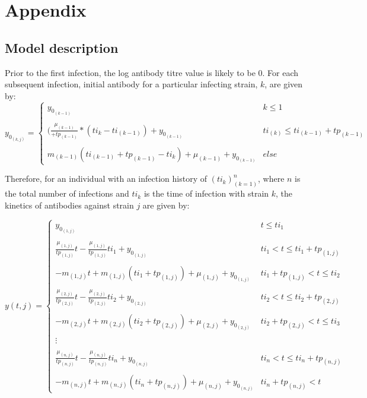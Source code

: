 \documentclass[a4paper,11pt,twoside]{article}
\begin{document}
\section{Appendix}
\subsection{Model description}
Prior to the first infection, the log antibody titre value is likely to be 0. For each subsequent infection, initial antibody for a particular infecting strain, $k$, are given by:
\begin{equation}
 y_{0_{(k,j)}}=\left\{
 \begin{array}{lr}
   y_{0_{(k-1)}} & k \leqslant 1\\\\
   (\frac{\mu_{(k-1)}}{+tp_{(k-1)}}*(ti_k-ti_{(k-1)}) + y_{0_{(k-1)}} & ti_{(k)} \leqslant ti_{(k-1)} + tp_{(k-1)}\\\\
   m_{(k-1)}(ti_{(k-1)}+tp_{(k-1)}-ti_k)+\mu_{(k-1)} + y_{0_{(k-1)}}& else
 \end{array}
\right.
\end{equation}

Therefore, for an individual with an infection history of $(ti_k)_{(k=1)}^n$, where $n$ is the total number of infections and $ti_k$ is the time of infection with strain $k$, the kinetics of antibodies against strain $j$ are given by:

\begin{equation}
y(t, j) = \left\{
\begin{array}{lr}
y_{0_{(1,j)}} & t \leqslant ti_1\\\\
\frac{\mu_{(1,j)}}{tp_{(1,j)}}t-\frac{\mu_{(1,j)}}{tp_{(1,j)}}ti_1 + y_{0_{(1,j)}} & ti_1 < t \leqslant ti_1 + tp_{(1,j)}\\\\
-m_{(1,j)}t + m_{(1,j)}(ti_1+tp_{(1,j)})+\mu_{(1,j)}+y_{0_{(1,j)}} & ti_1+tp_{(1,j)} < t \leqslant ti_2\\\\
\frac{\mu_{(2,j)}}{tp_{(2,j)}}t-\frac{\mu_{(2,j)}}{tp_{(2,j)}}ti_2 + y_{0_{(2,j)}} & ti_2 < t \leqslant ti_2 + tp_{(2,j)}\\\\
-m_{(2,j)}t + m_{(2,j)}(ti_2+tp_{(2,j)})+\mu_{(2,j)}+y_{0_{(2,j)}} & ti_2+tp_{(2,j)} < t \leqslant ti_3\\\\
\vdots\\\\
\frac{\mu_{(n,j)}}{tp_{(n,j)}}t-\frac{\mu_{(n,j)}}{tp_{(n,j)}}ti_n + y_{0_{(n,j)}} & ti_n < t \leqslant ti_n + tp_{(n,j)}\\\\
-m_{(n,j)}t + m_{(n,j)}(ti_n+tp_{(n,j)})+\mu_{(n,j)}+y_{0_{(n,j)}} & ti_n+tp_{(n,j)} < t
\end{array}
\right.
\end{equation}
\end{document}
